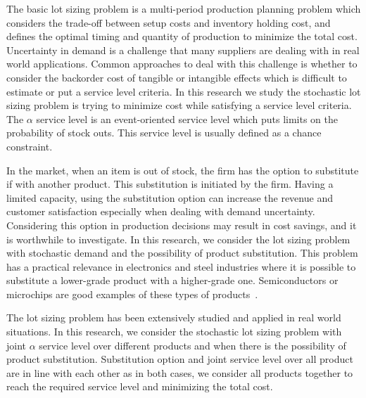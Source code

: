 \documentclass[10pt]{article}
\begin{document}
The basic lot sizing problem is a multi-period production planning problem which considers the trade-off between setup costs and inventory holding cost, and defines the optimal timing and quantity of production to minimize the total cost. 
Uncertainty in demand is a challenge that many suppliers are dealing with in real world applications. 
Common approaches to deal with this challenge is whether to consider the backorder cost of tangible or intangible effects which is difficult to estimate or put a service level criteria. 
In this research we study the stochastic lot sizing problem is trying to minimize cost while satisfying a service level criteria. The $\alpha$ service level is an event-oriented service level which puts limits on the probability of stock outs. This service level is usually defined as a chance constraint. 

In the market, when an item is out of stock, the firm has the option to substitute if with another product. This substitution is initiated by the firm. Having a limited capacity, using the substitution option can increase the revenue and customer satisfaction especially when dealing with demand uncertainty. Considering this option in production decisions may result in cost savings, and it is worthwhile to investigate. In this research, we consider the  lot sizing problem with stochastic demand and the possibility of product substitution. This problem has a practical relevance in electronics and steel industries where it is possible to substitute a lower-grade product with a higher-grade one. Semiconductors or microchips are good examples of these types of products~\cite{lang2010efficient}. 

The lot sizing problem has been extensively studied and applied in real world situations. 
In this research, we consider the stochastic lot sizing problem with joint $\alpha$ service level over different products and when there is the possibility of product substitution. Substitution option and joint service level over all product are in line with each other as in both cases, we consider all products together to reach the required service level and minimizing the total cost. 
\end{document}
